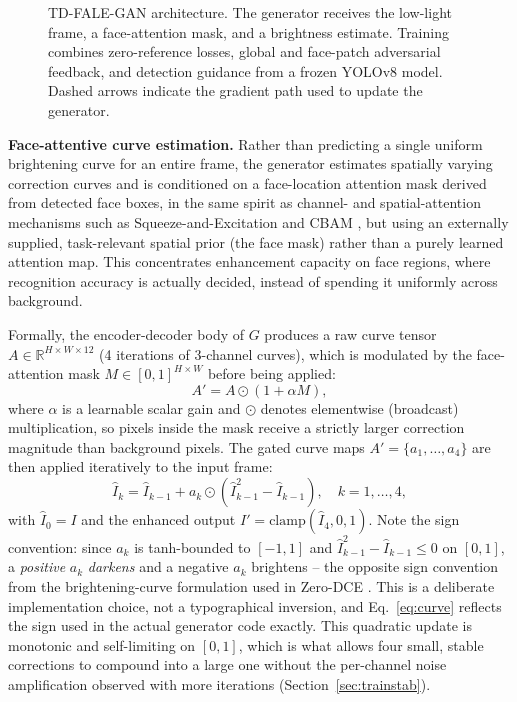 \documentclass[conference]{IEEEtran}
\begin{document}
\begin{figure}[t]
{%
}
\caption{TD-FALE-GAN architecture. The generator receives the low-light
frame, a face-attention mask, and a brightness estimate. Training combines
zero-reference losses, global and face-patch adversarial feedback, and
detection guidance from a frozen YOLOv8 model. Dashed arrows indicate the
gradient path used to update the generator.}
\label{fig:arch}
\end{figure}

\textbf{Face-attentive curve estimation.} Rather than predicting
a single uniform brightening curve for an entire frame, the
generator estimates spatially varying correction curves and is
conditioned on a face-location attention mask derived from
detected face boxes, in the same spirit as channel- and
spatial-attention mechanisms such as Squeeze-and-Excitation
\cite{senet} and CBAM \cite{cbam}, but using an externally
supplied, task-relevant spatial prior (the face mask) rather than
a purely learned attention map. This concentrates enhancement capacity on
face regions, where recognition accuracy is actually decided,
instead of spending it uniformly across background.

Formally, the encoder-decoder body of $G$ produces a raw curve
tensor $A \in \mathbb{R}^{H\times W\times 12}$ (4 iterations of
3-channel curves), which is modulated by the face-attention mask
$M \in [0,1]^{H\times W}$ before being applied:
\begin{equation}
A' = A \odot \left(1 + \alpha M\right),
\label{eq:gate}
\end{equation}
where $\alpha$ is a learnable scalar gain and $\odot$ denotes
elementwise (broadcast) multiplication, so pixels inside the mask
receive a strictly larger correction magnitude than background
pixels. The gated curve maps $A' = \{a_1,\dots,a_4\}$ are then
applied iteratively to the input frame:
\begin{equation}
\hat{I}_k = \hat{I}_{k-1} + a_k \odot \left(\hat{I}_{k-1}^{2} - \hat{I}_{k-1}\right),
\quad k = 1,\dots,4,
\label{eq:curve}
\end{equation}
with $\hat{I}_0 = I$ and the enhanced output $I' =
\mathrm{clamp}(\hat{I}_4, 0, 1)$. Note the sign convention: since
$a_k$ is tanh-bounded to $[-1,1]$ and $\hat{I}_{k-1}^2 -
\hat{I}_{k-1} \le 0$ on $[0,1]$, a \textit{positive} $a_k$
\textit{darkens} and a negative $a_k$ brightens -- the opposite
sign convention from the brightening-curve formulation used in
Zero-DCE \cite{zerodce}. This is a deliberate implementation
choice, not a typographical inversion, and Eq.~\ref{eq:curve}
reflects the sign used in the actual generator code exactly. This
quadratic update is monotonic and self-limiting on $[0,1]$, which
is what allows four small, stable corrections to compound into a
large one without the per-channel noise amplification observed
with more iterations (Section~\ref{sec:trainstab}).
\end{document}
